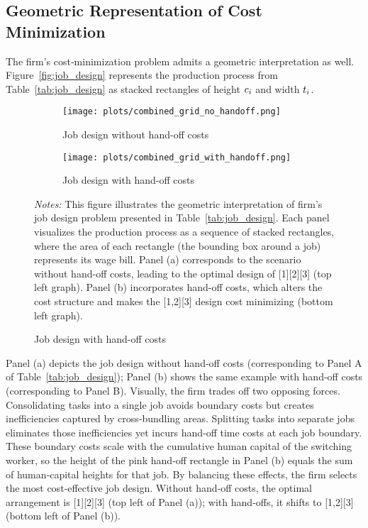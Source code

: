\documentclass{article}
\theoremstyle{plain}
\theoremstyle{plain}
\begin{document}
\subsection{Geometric Representation of Cost Minimization}
The firm’s cost‐minimization problem admits a geometric interpretation as well.  
Figure~\ref{fig:job_design} represents the production process from Table~\ref{tab:job_design} as stacked rectangles of height $c_{i}$ and width $t_{i}$.
\begin{figure}[htbp]
  \begin{center}
  \caption{Geometric interpretation of job designs for the \(n=3\) tasks example} \label{fig:job_design}
  \begin{subfigure}[b]{0.93\textwidth}
    \texttt{[image: plots/combined\_grid\_no\_handoff.png]}
    \caption{Job design without hand-off costs}
  \end{subfigure}
  \hfill
  \begin{subfigure}[b]{0.93\textwidth}
    \texttt{[image: plots/combined\_grid\_with\_handoff.png]}
    \caption{Job design with hand-off costs}
  \end{subfigure}
  \end{center}
  \footnotesize{\emph{Notes:} This figure illustrates the geometric interpretation of firm's job design problem presented in Table~\ref{tab:job_design}. Each panel visualizes the production process as a sequence of stacked rectangles, where the area of each rectangle (the bounding box around a job) represents its wage bill. Panel (a) corresponds to the scenario without hand-off costs, leading to the optimal design of [1][2][3] (top left graph). Panel (b) incorporates hand-off costs, which alters the cost structure and makes the [1,2][3] design cost minimizing (bottom left graph).}
\end{figure}
Panel (a) depicts the job design without hand‐off costs (corresponding to Panel A of Table~\ref{tab:job_design}); Panel (b) shows the same example with hand‐off costs (corresponding to Panel B).  
Visually, the firm trades off two opposing forces.
Consolidating tasks into a single job avoids boundary costs but creates inefficiencies captured by cross‐bundling areas.  
Splitting tasks into separate jobs eliminates those inefficiencies yet incurs hand‐off time costs at each job boundary.  
These boundary costs scale with the cumulative human capital of the switching worker, so the height of the pink hand‐off rectangle in Panel (b) equals the sum of human‐capital heights for that job.
By balancing these effects, the firm selects the most cost‐effective job design.  
Without hand‐off costs, the optimal arrangement is [1][2][3] (top left of Panel (a)); with hand‐offs, it shifts to [1,2][3] (bottom left of Panel (b)).  
\end{document}
